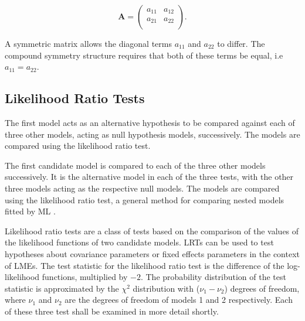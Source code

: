 \documentclass[12pt, a4paper]{report}
\theoremstyle{plain}
\theoremstyle{definition}
\theoremstyle{remark}
\begin{document}
	\[
	\boldsymbol{A} = \left( \begin{array}{cc}
	a_{11} & a_{12}  \\
	a_{21} & a_{22}  \\
	\end{array}\right).
	\]
	
	A symmetric matrix allows the diagonal terms $a_{11}$ and $a_{22}$ to differ. The compound symmetry structure requires that both of these terms be equal, i.e $a_{11} = a_{22}$.

\subsection{Likelihood Ratio Tests}	
	The first model acts as an alternative hypothesis to be compared against each of three other models, acting as null hypothesis models, successively. The models are compared using the likelihood ratio test. 
	
	The first candidate model is compared to each of the three other models successively. It is the alternative model in each of the three tests, with the other three models acting as the respective null models. The models are compared using the likelihood ratio test, a general method for comparing nested models fitted by ML \citep{Lehmann2006}.
	
	Likelihood ratio tests are a class of tests based on the comparison of the values of the likelihood functions of two candidate models. LRTs can be used to test hypotheses about covariance parameters or fixed effects parameters in the context of LMEs. The test statistic for the likelihood ratio test is the difference of the log-likelihood functions, multiplied by $-2$.
	The probability distribution of the test statistic is approximated by the $\chi^2$ distribution with ($\nu_{1} - \nu_{2}$) degrees of freedom, where $\nu_{1}$ and $\nu_{2}$ are the degrees of freedom of models 1 and 2 respectively. Each of these three test shall be examined in more detail shortly.
	

	
	
\end{document}
